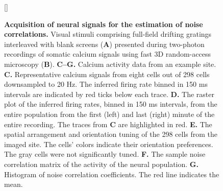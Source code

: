 \documentclass[10pt]{article}
\begin{document}
\begin{figure}    [\FBwidth]
    {\caption{{\bf Acquisition of neural signals for the estimation of noise correlations.}
    Visual stimuli comprising full-field drifting gratings interleaved with blank screens ({\bf A}) presented during two-photon recordings of somatic calcium signals using fast 3D random-access microscopy ({\bf B}). 
    {\bf C--G.} Calcium activity data from an example site.
    {\bf C.} Representative calcium signals from eight cells out of 298 cells downsampled to 20 Hz. The inferred firing rate binned in 150 ms intervals are indicated by red ticks below each trace.
    {\bf D.} The raster plot of the inferred firing rates, binned in 150 ms intervals, from the entire population from the first (left) and last (right) minute of the entire recording.  The traces from {\bf C} are highlighted in red.
    {\bf E.} The spatial arrangement and orientation tuning of the 298 cells from the imaged site. The cells' colors indicate their orientation preferences. The gray cells were not significantly tuned.
    {\bf F.} The sample noise correlation matrix of the activity of the neural population. 
    {\bf G.} Histogram of noise correlation coefficients. The red line indicates the mean.
} \label{fig:03}}

\end{figure}
\end{document}
